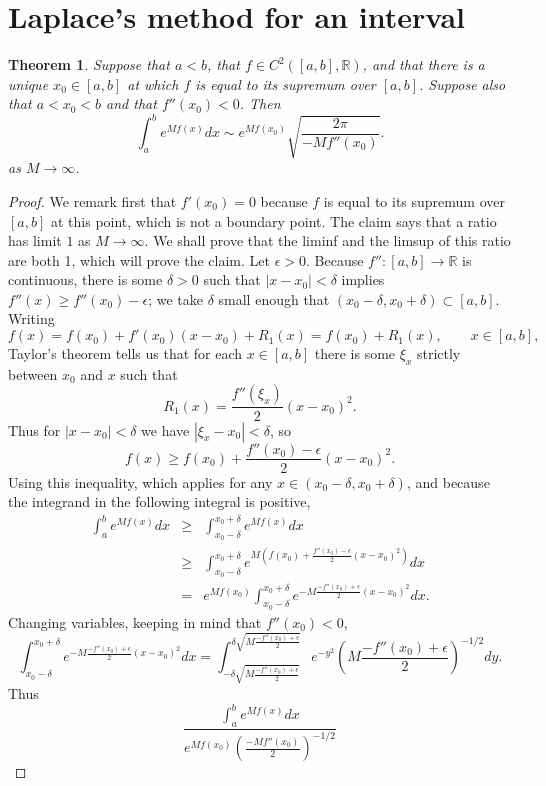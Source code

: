 \documentclass{article}
\newtheorem{theorem}{Theorem}
\theoremstyle{definition}
\begin{document}
\section{Laplace's method for an interval}
\begin{theorem}
Suppose that $a<b$, that $f \in C^2([a,b],\mathbb{R})$, and that
there is a unique $x_0 \in [a,b]$ at which $f$ is equal to its supremum over $[a,b]$. Suppose also that
$a<x_0<b$ and 
that $f''(x_0)<0$. Then
\[
\int_a^b e^{Mf(x)} dx \sim e^{Mf(x_0)} \sqrt{\frac{2\pi}{-Mf''(x_0)}}.
\]
as $M \to \infty$.
\end{theorem}
\begin{proof}
We remark first that $f'(x_0)=0$ because $f$ is equal to its supremum over $[a,b]$ at this point, which is not a boundary point.
The claim says that a ratio has limit $1$ as $M \to \infty$. We shall prove that
the liminf and the limsup of this ratio are both 1, which will prove the claim.
Let $\epsilon>0$. Because $f'':[a,b] \to \mathbb{R}$ is continuous,
 there is some $\delta>0$ such that $|x-x_0|<\delta$ implies
 $f''(x) \geq f''(x_0)-\epsilon$; we take $\delta$ small enough that $(x_0-\delta,x_0+\delta) \subset [a,b]$. Writing
 \[
 f(x)=f(x_0)+f'(x_0)(x-x_0)+R_1(x)
 =f(x_0)+R_1(x), \qquad x \in [a,b],
 \]
 Taylor's theorem tells us that for each $x \in [a,b]$  there is some $\xi_x$ strictly between $x_0$ and $x$ such that
\[
R_1(x) = \frac{f''(\xi_x)}{2}(x-x_0)^2.
\]
Thus for $|x-x_0|<\delta$ we have $|\xi_x-x_0|<\delta$, so 
\[
f(x)  \geq f(x_0)+\frac{f''(x_0)-\epsilon}{2}(x-x_0)^2.
\]
Using this inequality, which applies for any $x \in (x_0-\delta,x_0+\delta)$, and because the integrand in the following integral is positive,
\begin{eqnarray*}
\int_a^b e^{Mf(x)} dx &\geq& \int_{x_0-\delta}^{x_0+\delta} e^{Mf(x)} dx\\
&\geq& \int_{x_0-\delta}^{x_0+\delta} e^{M\left(f(x_0)+\frac{f''(x_0)-\epsilon}{2}(x-x_0)^2\right)} dx\\
&=&e^{Mf(x_0)}  \int_{x_0-\delta}^{x_0+\delta}  e^{-M\frac{-f''(x_0)+\epsilon}{2}(x-x_0)^2} dx.
\end{eqnarray*}
Changing variables, keeping in mind that $f''(x_0)<0$,
\[
\int_{x_0-\delta}^{x_0+\delta}  e^{-M\frac{-f''(x_0)+\epsilon}{2}(x-x_0)^2} dx = 
\int_{-\delta \sqrt{M\frac{-f''(x_0)+\epsilon}{2}}}^{\delta \sqrt{M\frac{-f''(x_0)+\epsilon}{2}}}
e^{-y^2} \left(M\frac{-f''(x_0)+\epsilon}{2}\right)^{-1/2} dy.
\]
Thus 
\begin{equation}
\frac{\int_a^b e^{Mf(x)} dx}{e^{Mf(x_0)} \left(\frac{-Mf''(x_0)}{2}\right)^{-1/2}}

\end{equation}
\end{proof}
\end{document}
